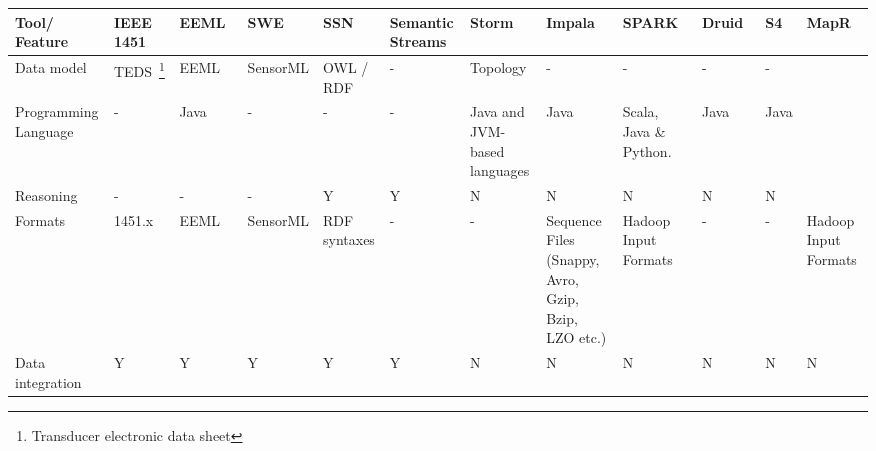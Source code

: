 \begin{sidewaystable}[!ht]
\renewcommand{\arraystretch}{1.3}
\tiny
\begin{center}
\begin{tabular}[c]{|p{1.7cm}|p{1.5cm}|p{1.5cm}|p{1.5cm}|p{1.5cm}|p{1.5cm}|p{1.5cm}|p{1.5cm}|p{1.5cm}|p{1.5cm}|p{1.5cm}|p{1.5cm}|} 
\hline
 \textbf{Tool/ Feature} & IEEE 1451 &  EEML~\cite{eeml} & SWE~\cite{sensorweb-wb} & SSN~\cite{Compton:2012:OPS:2400766.2401456} & Semantic Streams~\cite{Whitehouse:2006:SSF:2180141.2180148} & Storm~\cite{BigDataManing} & Impala~\cite{impala-project} & SPARK~\cite{zaharia2012discretized} & Druid~\cite{yangdruid} & S4~\cite{neumeyer2010s4}  & MapR~\cite{mapr-project}\\ \hline
  Data model & TEDS~\footnote{Transducer electronic data sheet} & EEML & SensorML & OWL / RDF & -  & Topology & - & - & - & - & \\ \hline  
  Programming Language & - &  Java & - & -& - & Java and JVM-based languages & Java & Scala, Java \& Python. & Java & Java & \\ \hline  
  Reasoning & - & - &  - & Y & Y & N & N & N & N &  N & \\ \hline  
  Formats & 1451.x & EEML & SensorML & RDF syntaxes & - & - & Sequence Files (Snappy, Avro, Gzip, Bzip, LZO etc.) & Hadoop Input Formats & - & - &Hadoop Input Formats \\ \hline  
  Data integration & Y & Y & Y  & Y & Y & N & N & N & N & N & N \\ \hline  

\end{tabular}
\end{center}
\end{sidewaystable}
